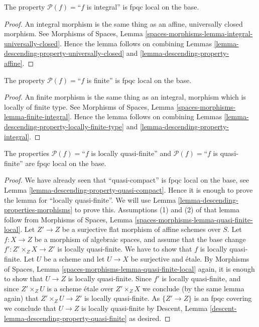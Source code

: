 \begin{lemma}
\label{lemma-descending-property-integral}
The property $\mathcal{P}(f) =$``$f$ is integral''
is fpqc local on the base.
\end{lemma}

\begin{proof}
An integral morphism is the same thing as an affine,
universally closed morphism. See
Morphisms of Spaces,
Lemma \ref{spaces-morphisms-lemma-integral-universally-closed}.
Hence the lemma follows on combining
Lemmas \ref{lemma-descending-property-universally-closed}
and \ref{lemma-descending-property-affine}.
\end{proof}

\begin{lemma}
\label{lemma-descending-property-finite}
The property $\mathcal{P}(f) =$``$f$ is finite''
is fpqc local on the base.
\end{lemma}

\begin{proof}
An finite morphism is the same thing as an integral,
morphism which is locally of finite type. See
Morphisms of Spaces, Lemma \ref{spaces-morphisms-lemma-finite-integral}.
Hence the lemma follows on combining
Lemmas \ref{lemma-descending-property-locally-finite-type}
and \ref{lemma-descending-property-integral}.
\end{proof}

\begin{lemma}
\label{lemma-descending-property-quasi-finite}
The properties
$\mathcal{P}(f) =$``$f$ is locally quasi-finite''
and
$\mathcal{P}(f) =$``$f$ is quasi-finite''
are fpqc local on the base.
\end{lemma}

\begin{proof}
We have already seen that ``quasi-compact'' is fpqc local on the base, see
Lemma \ref{lemma-descending-property-quasi-compact}. Hence it is enough
to prove the lemma for ``locally quasi-finite''. We will use
Lemma \ref{lemma-descending-properties-morphisms}
to prove this. Assumptions (1) and (2) of that lemma follow from
Morphisms of Spaces,
Lemma \ref{spaces-morphisms-lemma-quasi-finite-local}.
Let $Z' \to Z$ be a surjective flat morphism of affine schemes over $S$.
Let $f : X \to Z$ be a morphism of algebraic spaces, and assume
that the base change $f' : Z' \times_Z X \to Z'$ is locally quasi-finite.
We have to show that $f$ is locally quasi-finite. Let $U$ be a scheme
and let $U \to X$ be surjective and \'etale. By
Morphisms of Spaces,
Lemma \ref{spaces-morphisms-lemma-quasi-finite-local}
again, it is enough to show that $U \to Z$ is locally quasi-finite.
Since $f'$ is locally quasi-finite, and since $Z' \times_Z U$ is a
scheme \'etale over $Z' \times_Z X$ we conclude (by the same lemma again) that
$Z' \times_Z U \to Z'$ is locally quasi-finite.
As $\{Z' \to Z\}$ is an fpqc covering we conclude that
$U \to Z$ is locally quasi-finite by
Descent, Lemma \ref{descent-lemma-descending-property-quasi-finite}
as desired.
\end{proof}


